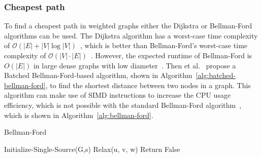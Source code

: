 \subsubsection{Cheapest path}
To find a cheapest path in weighted graphs either the Dijkstra or Bellman-Ford algorithms can be used. The Dijkstra algorithm has a worst-case time complexity of $\mathcal{O}(|E|+|V|\log|V|)$~\cite{10.1145/28869.28874}, which is better than Bellman-Ford's worst-case time complexity of $\mathcal{O}(|V|\cdot|E|)$~\cite{bannister2011randomized}.
However, the expected runtime of Bellman-Ford is $O(|E|)$ in large dense graphs with low diameter~\cite{Yen1970AnAF}.
Then et al.~\cite{DBLP:journals/dbsk/ThenGKN17} propose a Batched Bellman-Ford-based algorithm, shown in Algorithm~\ref{alg:batched-bellman-ford}, to find the shortest distance between two nodes in a graph.
This algorithm can make use of SIMD instructions to increase the CPU usage efficiency, which is not possible with the standard Bellman-Ford algorithm~\cite{bellman1958routing}, which is shown in Algorithm~\ref{alg:bellman-ford}. 

\begin{algorithm}
\caption{Bellman-Ford}
\label{alg:bellman-ford}
\begin{algorithmic}[2]
    \State Initialize-Single-Source(G,s)
            \State Relax(u, v, w)
        \EndFor
    \EndFor
            \State Return False
        \EndIf
    \EndFor
    
 
\end{algorithmic}
\end{algorithm}

